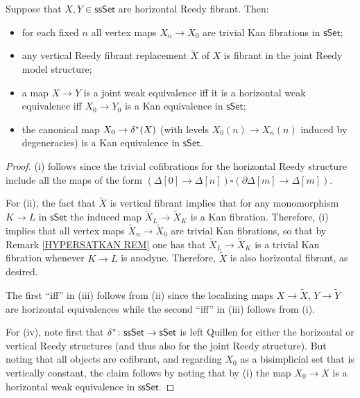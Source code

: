 \documentclass[a4paper,10pt
,draft
]{article}%
\begin{document}
\begin{proposition}\label{SSSETJREE PROP}
	Suppose that $X, Y \in \mathsf{ssSet}$ are horizontal Reedy fibrant. Then:
\begin{itemize}
	\item[(i)] for each fixed $n$ all vertex maps $X_{n} \to X_{0}$ are trivial Kan fibrations in $\mathsf{sSet}$;
	\item[(ii)] any vertical Reedy fibrant replacement $\tilde{X}$ of $X$ is fibrant in the joint Reedy model structure;
	\item[(iii)] a map $X \to Y$ is a joint weak equivalence
	iff it is a horizontal weak equivalence 
	iff $X_0 \to Y_0$ is a Kan equivalence in $\mathsf{sSet}$;
	\item[(iv)] the canonical map $X_{0} \to \delta^{\**}(X)$
	(with levels $X_0(n) \to X_n(n)$ induced by degeneracies) is a Kan equivalence in $\mathsf{sSet}$. 
\end{itemize}
\end{proposition}


\begin{proof}
(i) follows since the trivial cofibrations for the horizontal Reedy structure include all the maps of the form
$(\Delta[0] \to \Delta[n]) \square (\partial \Delta[m] \to \Delta[m])$.

For (ii), the fact that $\tilde{X}$ is vertical fibrant
implies that for any monomorphism $K \to L$ in $\mathsf{sSet}$
the induced map $\tilde{X}_L \to \tilde{X}_K$ is a Kan fibration. Therefore, (i) implies that all vertex maps
$\tilde{X}_{n} \to \tilde{X}_{0}$
are trivial Kan fibrations, so that by
Remark \ref{HYPERSATKAN REM} one has that 
$\tilde{X}_L \to \tilde{X}_K$ is a trivial Kan fibration whenever
$K \to L$ is anodyne.
Therefore, $\tilde{X}$ is also horizontal fibrant, as desired.


The first ``iff'' in (iii) follows from (ii) since the localizing maps 
$X \to \tilde{X}$, $Y \to \tilde{Y}$
are horizontal equivalences
while the second ``iff'' in (iii) follows from (i).

For (iv), note first that 
$\delta^{\**} \colon \mathsf{ssSet} \to \mathsf{sSet}$
is left Quillen for either the horizontal or vertical Reedy structures (and thus also for the joint Reedy structure).
But noting that all objects are cofibrant, and regarding 
$X_{0}$ as a bisimplicial set that is vertically constant, 
the claim follows by noting that by (i) the map
$X_{0} \to X$ is a horizontal weak equivalence in $\mathsf{ssSet}$.
\end{proof}
\end{document}

